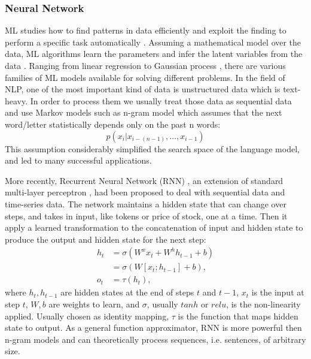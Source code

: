 \documentclass[12pt]{report}
\begin{document}
\subsubsection{Neural Network} ML studies how to find patterns in data efficiently and exploit the finding to perform a specific task automatically \cite{bishop_pattern_2006}. Assuming a mathematical model over the data, ML algorithms learn the parameters and infer the latent variables from the data \cite{barber_bayesian_2012}. Ranging from linear regression \cite{freedman_statistical_2009} to Gaussian process \cite{rasmussen_gaussian_2004}, there are various families of ML models available for solving different problems. In the field of NLP, one of the most important kind of data is unstructured data which is text-heavy. In order to process them we usually treat those data as sequential data and use Markov models such as n-gram model \cite{jurafsky_speech_2000} which assumes that the next word/letter statistically depends only on the past n words:
\[p(x_i|x_{i-(n-1)},\dots,x_{i-1})\]
This assumption considerably simplified the search space of the language model, and led to many successful applications.

More recently, Recurrent Neural Network (RNN) \cite{elman_finding_1990}, an extension of standard multi-layer perceptron \cite{van_der_malsburg_frank_1986}, had been proposed to
deal with sequential data and time-series data. The network maintains a hidden state that can change over steps, and takes in input, like tokens or price of stock, one at a time. Then it apply a learned transformation to the concatenation of input and hidden state to produce the output and hidden state for the next step:
\begin{align*}
h_{t} &= \sigma(W^xx_t+W^hh_{t-1}+b)\\
&= \sigma(W[x_t;h_{t-1}]+b),\\
o_{t} &= \tau(h_{t}),
\end{align*}
where $h_t, h_{t-1}$ are hidden states at the end of steps $t$ and $t-1$, $x_t$ is the input at step $t$, $W, b$ are weights to learn, and $\sigma$, usually $tanh$ or $relu$, is the non-linearity applied. Usually chosen as identity mapping, $\tau$ is the function that maps hidden state to output. As a general function approximator, RNN is more powerful then n-gram models and can theoretically process sequences, i.e. sentences, of arbitrary size.
\end{document}
